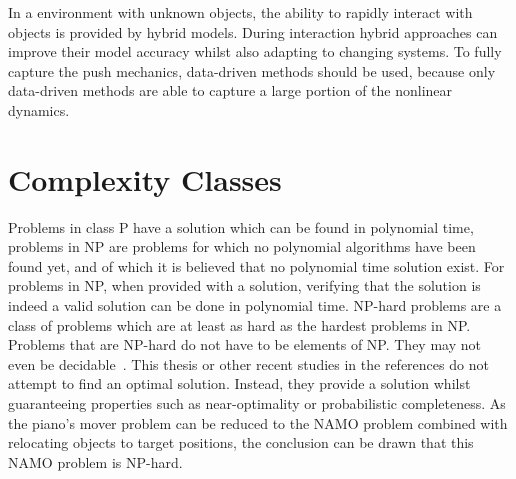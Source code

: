 In a environment with unknown objects, the ability to rapidly interact with objects is provided by hybrid models. During interaction hybrid approaches can improve their model accuracy whilst also adapting to changing systems. To fully capture the push mechanics, data-driven methods should be used, because only data-driven methods are able to capture a large portion of the nonlinear dynamics.


%

\chapter{Complexity Classes}%
\label{chap:appendix_complexity_classes}
Problems in class P have a solution which can be found in polynomial time, problems in \ac{NP} are problems for which no polynomial algorithms have been found yet, and of which it is believed that no polynomial time solution exist. For problems in \ac{NP}, when provided with a solution, verifying that the solution is indeed a valid solution can be done in polynomial time. \ac{NP-hard} problems are a class of problems which are at least as hard as the hardest problems in \ac{NP}. Problems that are \ac{NP-hard} do not have to be elements of NP. They may not even be decidable~\cite{pokharel_computational_2020}. This thesis or other recent studies in the references do not attempt to find an optimal solution. Instead, they provide a solution whilst guaranteeing properties such as near-optimality or probabilistic completeness. As the piano's mover problem can be reduced to the \ac{NAMO} problem combined with relocating objects to target positions, the conclusion can be drawn that this \ac{NAMO} problem is \ac{NP-hard}.\bs


